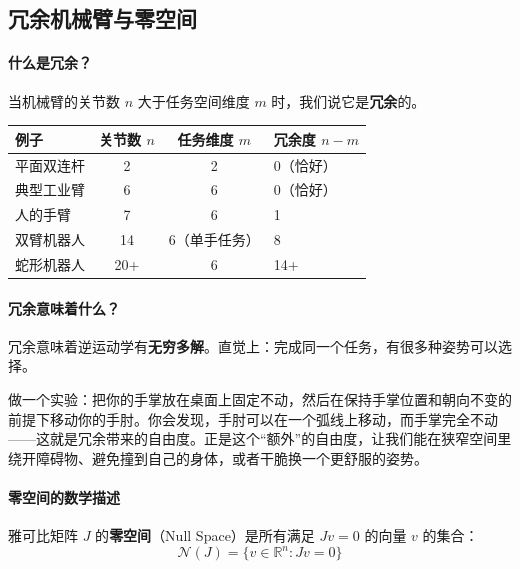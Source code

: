 \subsection{冗余机械臂与零空间}

\paragraph{什么是冗余？}

当机械臂的关节数 $n$ 大于任务空间维度 $m$ 时，我们说它是\textbf{冗余}的。

\begin{center}
\renewcommand{\arraystretch}{1.3}
\begin{tabular}{l|c|c|l}
\toprule
\textbf{例子} & \textbf{关节数 $n$} & \textbf{任务维度 $m$} & \textbf{冗余度 $n-m$} \\
\midrule
平面双连杆 & 2 & 2 & 0（恰好） \\
典型工业臂 & 6 & 6 & 0（恰好） \\
人的手臂 & 7 & 6 & 1 \\
双臂机器人 & 14 & 6（单手任务） & 8 \\
蛇形机器人 & 20+ & 6 & 14+ \\
\bottomrule
\end{tabular}
\end{center}

\paragraph{冗余意味着什么？}

冗余意味着逆运动学有\textbf{无穷多解}。直觉上：完成同一个任务，有很多种姿势可以选择。

\begin{example}[人手臂的冗余]
做一个实验：把你的手掌放在桌面上固定不动，然后在保持手掌位置和朝向不变的前提下移动你的手肘。你会发现，手肘可以在一个弧线上移动，而手掌完全不动——这就是冗余带来的自由度。正是这个“额外”的自由度，让我们能在狭窄空间里绕开障碍物、避免撞到自己的身体，或者干脆换一个更舒服的姿势。
\end{example}

\paragraph{零空间的数学描述}\mbox{}\par\nopagebreak

\begin{definition}[零空间]
雅可比矩阵 $J$ 的\textbf{零空间}（Null Space）是所有满足 $J v = 0$ 的向量 $v$ 的集合：
\[
\mathcal{N}(J) = \{ v \in \mathbb{R}^n : Jv = 0 \}
\]
\end{definition}

